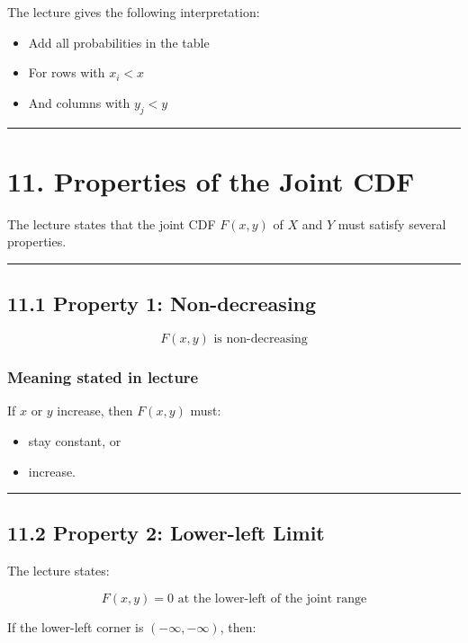 \documentclass[12pt]{article}
\begin{document}
The lecture gives the following interpretation:

\begin{itemize}
    \item Add all probabilities in the table
    \item For rows with \(x_i<x\)
    \item And columns with \(y_j<y\)
\end{itemize}

\hrule
\vspace{1em}

\section*{11. Properties of the Joint CDF}

The lecture states that the joint CDF \(F(x,y)\) of \(X\) and \(Y\) must satisfy several properties.

\hrule
\vspace{1em}

\subsection*{11.1 Property 1: Non-decreasing}

\[
F(x,y) \text{ is non-decreasing}
\]

\subsubsection*{Meaning stated in lecture}

If \(x\) or \(y\) increase, then \(F(x,y)\) must:

\begin{itemize}
    \item stay constant, or
    \item increase.
\end{itemize}

\hrule
\vspace{1em}

\subsection*{11.2 Property 2: Lower-left Limit}

The lecture states:

\[
F(x,y)=0 \text{ at the lower-left of the joint range}
\]

If the lower-left corner is \((-\infty,-\infty)\), then:
\end{document}

